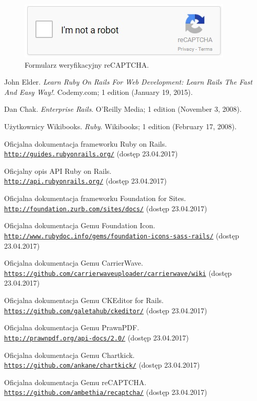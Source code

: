 \documentclass[openright]{xmgr}
\begin{document}
\begin{figure}[!tbh]
\centering
\includegraphics[width=.6\linewidth]{fig/captcha}
\caption{Formularz weryfikacyjny reCAPTCHA.}
\end{figure}

\begin{thebibliography}{9}
John Elder.
\textit{Learn Ruby On Rails For Web Development: Learn Rails The Fast And Easy Way!}. 
Codemy.com; 1 edition (January 19, 2015).
 
Dan Chak.
\textit{Enterprise Rails}. 
O'Reilly Media; 1 edition (November 3, 2008).

Użytkownicy Wikibooks.
\textit{Ruby}. 
Wikibooks; 1 edition (February 17, 2008).

Oficjalna dokumentacja frameworku Ruby on Rails.
\\\texttt{\url{http://guides.rubyonrails.org/}} (dostęp 23.04.2017)

Oficjalny opis API Ruby on Rails. 
\\\texttt{\url{http://api.rubyonrails.org/}} (dostęp 23.04.2017)

Oficjalna dokumentacja frameworku Foundation for Sites. 
\\\texttt{\url{http://foundation.zurb.com/sites/docs/}} (dostęp 23.04.2017)

Oficjalna dokumentacja Gemu Foundation Icon.
\\\texttt{\url{http://www.rubydoc.info/gems/foundation-icons-sass-rails/}} (dostęp 23.04.2017)

Oficjalna dokumentacja Gemu CarrierWave.
\\\texttt{\url{https://github.com/carrierwaveuploader/carrierwave/wiki}} (dostęp 23.04.2017)

Oficjalna dokumentacja Gemu CKEditor for Rails.
\\\texttt{\url{https://github.com/galetahub/ckeditor/}} (dostęp 23.04.2017)

Oficjalna dokumentacja Gemu PrawnPDF.
\\\texttt{\url{http://prawnpdf.org/api-docs/2.0/}} (dostęp 23.04.2017)

Oficjalna dokumentacja Gemu Chartkick.
\\\texttt{\url{https://github.com/ankane/chartkick/}} (dostęp 23.04.2017)

Oficjalna dokumentacja Gemu reCAPTCHA.
\\\texttt{\url{https://github.com/ambethia/recaptcha/}} (dostęp 23.04.2017)

\end{thebibliography}
\end{document}

